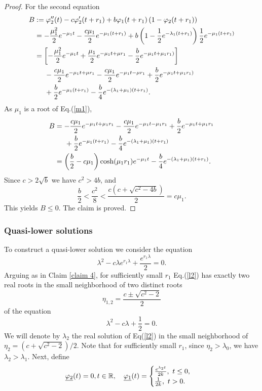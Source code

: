 \documentclass[12pt,letterpaper]{amsart}
\theoremstyle{definition}
\theoremstyle{remark}
\numberwithin{equation}{section}
\begin{document}
\begin{proof}
For the second equation
\begin{align*}
B&:= \varphi_{2}^{\prime\prime}(t)-c\varphi_{2}^{\prime}(t+r_1)+b\varphi_{1}(t+r_1)\left(
1-\varphi_{2}(t+r_1)\right)  \\
&= -\frac{\mu_1^2}{2}e^{-\mu_1t}-\frac{c\mu_1}{2}e^{-\mu_1(t+r_1)}+b\left( 1-\frac{1}{2}e^{-\lambda_1(t+r_1)}\right) \frac{1}{2}e^{-\mu_1(t+r_1)}\\
&= \left[  -\frac{\mu_1^2}{2}e^{-\mu_1t} +\frac{\mu_1}{2}e^{-\mu_1t+\mu r_1} -\frac{b}{2}e^{-\mu_1 t+\mu_1r_1)} \right] 
\\
& \hspace{0.5cm} -\frac{c\mu_1}{2}e^{-\mu_1t+\mu r_1} -\frac{c\mu_1}{2}e^{-\mu_1t-\mu r_1} +\frac{b}{2}e^{-\mu_1 t+\mu_1r_1)} \\
& \hspace{0.5cm}+ \frac{b}{2}e^{-\mu_1(t+r_1)} -\frac{b}{4}e^{-(\lambda_1+\mu_1)(t+r_1)} .
\end{align*}
As $\mu_1$ is a root of Eq.(\ref{m1}),
\begin{align*}
B&= -\frac{c\mu_1}{2}e^{-\mu_1t+\mu_1 r_1} -\frac{c\mu_1}{2}e^{-\mu_1t-\mu_1 r_1} +\frac{b}{2}e^{-\mu_1 t+\mu_1r_1} \\
& \hspace{0.5cm} +\frac{b}{2}e^{-\mu_1(t+r_1)} -\frac{b}{4}e^{-(\lambda_1+\mu_1)(t+r_1)} \\
& = \left(\frac{b}{2}-c\mu_1 \right)\cosh (\mu_1 r_1)e^{-\mu_1t} -\frac{b}{4}e^{-(\lambda_1+\mu_1)(t+r_1)} .
\end{align*}
Since $c>2\sqrt{b}$ we have $c^2>4b$, and 
$$
\frac{b}{2} < \frac{c^2}{8} < \frac{c(c+\sqrt{c^2-4b})}{2}=c\mu_1 .
$$
This yields  $B\le 0.$ The claim is proved.
\end{proof}

\subsubsection{Quasi-lower solutions}
To construct a quasi-lower solution we consider the equation
\begin{equation}\label{l2}
\lambda^2 -c\lambda e^{r_1 \lambda}+\frac{e^{r_1\lambda}}{2}=0 .
\end{equation}
Arguing as in Claim \ref{claim 4}, for sufficiently small $r_1$ Eq.(\ref{l2}) has exactly two real roots
 in the small neighborhood of two distinct roots 
 $$
\eta_{1,2} =\frac{c\pm \sqrt{c^2-2}}{2} 
$$
of the equation
$$
\lambda ^2 -c\lambda +\frac{1}{2}=0 .
$$ 
We will denote by $\lambda_2$ the real solution of Eq(\ref{l2}) in the small neighborhood of $\eta_2=(c+\sqrt{c^2-2})/2$. Note that for sufficiently small $r_1$, since $\eta_2 >  \lambda_0$, we have $ \lambda_2>\lambda_1$. Next, define 
$$
\underline{\varphi_2}(t)=0, t\in \R ,\quad 
\underline{ \varphi_1}(t)=\begin{cases} \frac{ e^{\lambda_2t}}{2k}, \ t\le 0 ,\\
\frac{1}{2k} , \ t> 0.
\end{cases}
$$
\end{document}
